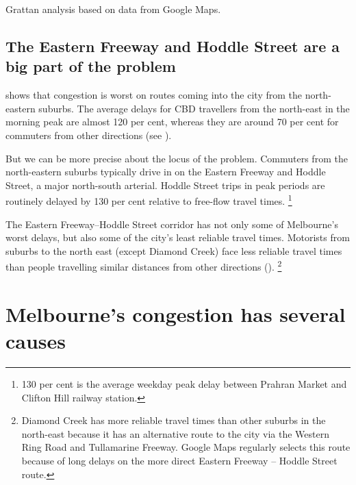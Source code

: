 \documentclass{grattan}
\begin{document}
{%
{Grattan analysis based on data from Google Maps.}
}

\subsection{The Eastern Freeway and Hoddle Street are a big part of the problem}

 shows that congestion is worst on routes coming into the city from the north-eastern suburbs.
The average delays for CBD travellers from the north-east in the morning peak are almost 120 per cent, whereas they are around 70 per cent for commuters from other directions (see ).



But we can be more precise about the locus of the problem. Commuters from the north-eastern suburbs typically drive in on the Eastern Freeway and Hoddle Street, a major north-south arterial. Hoddle Street trips in peak periods are routinely delayed by 130 per cent relative to free-flow travel times.%
    \footnote{130 per cent is the average weekday peak delay between Prahran Market and Clifton Hill railway station.}

The Eastern Freeway--Hoddle Street corridor has not only some of Melbourne's worst delays, but also some of the city's least reliable travel times. Motorists from suburbs to the north east (except Diamond Creek) face less reliable travel times than people travelling similar distances from other directions ().%
    \footnote{Diamond Creek has more reliable travel times than other suburbs in the north-east because it has an alternative route to the city via the Western Ring Road and Tullamarine Freeway.
Google Maps regularly selects this route because of long delays on the more direct Eastern Freeway -- Hoddle Street route.}

\section{Melbourne's congestion has several causes}%
\end{document}
